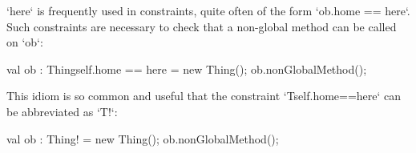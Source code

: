 \xcd`here` is frequently used in constraints, quite often of the form
\xcd`ob.home == here`. Such constraints are necessary to check that a
non-global method can be called on \xcd`ob`: 


\begin{xten}
val ob : Thing{self.home == here} = new Thing();
ob.nonGlobalMethod();
\end{xten}

This idiom is so common and useful that the constraint
\xcd`T{self.home==here}` can be abbreviated as \xcd`T!`: 

\begin{xten}
val ob : Thing! = new Thing();
ob.nonGlobalMethod();
\end{xten}



